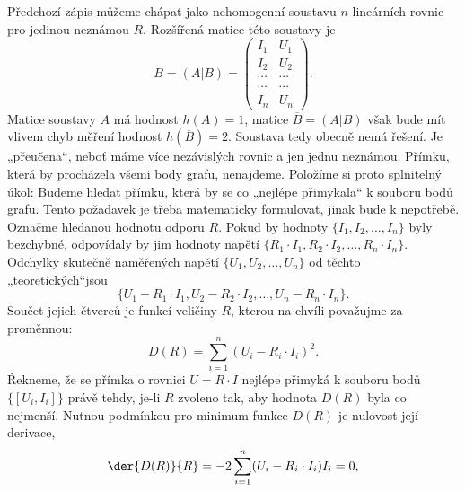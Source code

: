       Předchozí zápis můžeme chápat jako nehomogenní soustavu \(n\) lineárních rovnic pro jedinou
      neznámou \(R\). Rozšířená matice této soustavy je
      \begin{equation*}
        \overline{B} = (A\lvert B) = 
          \left(
            \begin{array}{c|c}
              I_1    & U_1     \\
              I_2    & U_2     \\
              \cdots & \cdots  \\
              \cdots & \cdots  \\
              I_n    & U_n
            \end{array}
          \right).
      \end{equation*}
      Matice soustavy \(A\) má hodnost \(h(A) = 1\), matice \(\overline{B} = (A\lvert B)\) však bude
      mít vlivem chyb měření hodnost \(h(\overline{B}) = 2\). Soustava tedy obecně nemá řešení. Je
      „přeučena“, neboť máme více nezávislých rovnic a jen jednu neznámou. Přímku, která by
      procházela všemi body grafu, nenajdeme. Položíme si proto splnitelný úkol: Budeme hledat
      přímku, která by se co „nejlépe přimykala“ k souboru bodů grafu. Tento požadavek je třeba
      matematicky formulovat, jinak bude k nepotřebě. Označme hledanou hodnotu odporu \(R\). Pokud
      by hodnoty \(\lbrace I_1, I_2, \ldots, I_n \rbrace\) byly bezchybné, odpovídaly by jim hodnoty
      napětí \(\lbrace R_1\cdot I_1, R_2\cdot I_2, \ldots, R_n\cdot I_n \rbrace\). Odchylky skutečně
      naměřených napětí \(\lbrace U_1, U_2, \ldots, U_n \rbrace\) od těchto „teoretických“jsou
      \begin{equation*}
        \lbrace U_1 - R_1\cdot I_1, U_2 - R_2\cdot I_2, \ldots, U_n - R_n\cdot I_n \rbrace.
      \end{equation*}
      Součet jejich čtverců je funkcí veličiny \(R\), kterou na chvíli považujme za proměnnou:
      \begin{equation*}
        D(R) = \sum_{i = 1}^{n}(U_i - R_i\cdot I_i)^2.
      \end{equation*}
      Řekneme, že se přímka o rovnici \(U = R\cdot I\) nejlépe přimyká k souboru bodů \(\lbrace[ 
      U_i, I_i]\rbrace\) právě tehdy, je-li \(R\) zvoleno tak, aby hodnota \(D(R)\) byla co 
      nejmenší. Nutnou podmínkou pro minimum funkce \(D(R)\) je nulovost její derivace,
      \begin{equation*}
        \der{D(R)}{R} = -2\sum_{i = 1}^{n}(U_i - R_i\cdot I_i)I_i = 0,
      \end{equation*}
